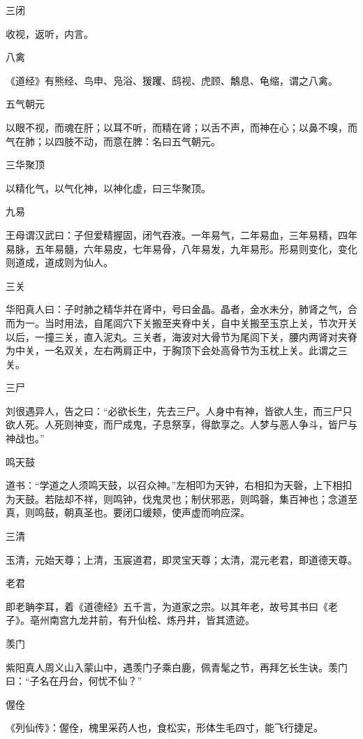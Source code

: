 \documentclass[a4paper,12pt,UTF8,twoside]{ctexbook}
\begin{document}
    三闭
    
    收视，返听，内言。
    
    八禽
    
    《道经》有熊经、鸟申、凫浴、猨躩、鸱视、虎顾、鷮息、龟缩，谓之八禽。
    
    五气朝元
    
    以眼不视，而魂在肝；以耳不听，而精在肾；以舌不声，而神在心；以鼻不嗅，而气在肺；以四肢不动，而意在脾：名曰五气朝元。
    
    三华聚顶
    
    以精化气，以气化神，以神化虚，曰三华聚顶。
    
    九易
    
    王母谓汉武曰：子但爱精握固，闭气吞液。一年易气，二年易血，三年易精，四年易脉，五年易髓，六年易皮，七年易骨，八年易发，九年易形。形易则变化，变化则道成，道成则为仙人。
    
    三关
    
    华阳真人曰：子时肺之精华并在肾中，号曰金晶。晶者，金水未分，肺肾之气，合而为一。当时用法，自尾闾穴下关搬至夹脊中关，自中关搬至玉京上关，节次开关以后，一撞三关，直入泥丸。三关者，海波对大骨节为尾闾下关，腰内两肾对夹脊为中关，一名双关，左右两肩正中，于胸顶下会处高骨节为玉枕上关。此谓之三关。
    
    三尸
    
    刘很遇异人，告之曰：“必欲长生，先去三尸。人身中有神，皆欲人生，而三尸只欲人死。人死则神变，而尸成鬼，子息祭享，得歆享之。人梦与恶人争斗，皆尸与神战也。”
    
    鸣天鼓
    
    道书：“学道之人须鸣天鼓，以召众神。”左相叩为天钟，右相扣为天磬，上下相扣为天鼓。若阹却不祥，则鸣钟，伐鬼灵也；制伏邪恶，则鸣磬，集百神也；念道至真，则鸣鼓，朝真圣也。要闭口缓颊，使声虚而响应深。
    
    三清
    
    玉清，元始天尊；上清，玉宸道君，即灵宝天尊；太清，混元老君，即道德天尊。
    
    老君
    
    即老聃李耳，着《道德经》五千言，为道家之宗。以其年老，故号其书曰《老子》。亳州南宫九龙井前，有升仙桧、炼丹井，皆其遗迹。
    
    羡门
    
    紫阳真人周义山入蒙山中，遇羡门子乘白鹿，佩青髦之节，再拜乞长生诀。羡门曰：“子名在丹台，何忧不仙？”
    
    偓佺
    
    《列仙传》：偓佺，槐里采药人也，食松实，形体生毛四寸，能飞行捷足。
    
\end{document}
